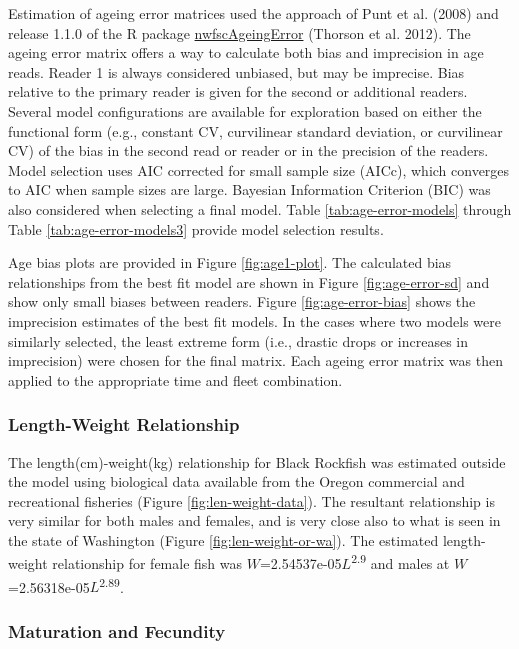 \documentclass[11pt,
  english,
  letterpaper,
]{article}
\begin{document}
Estimation of ageing error matrices used the approach of Punt et al. (2008) and release 1.1.0 of the R package \href{https://github.com/pfmc-assessment/nwfscAgeingError}{nwfscAgeingError} (Thorson et al. 2012). The ageing error matrix offers a way to calculate both bias and imprecision in age reads. Reader 1 is always considered unbiased, but may be imprecise. Bias relative to the primary reader is given for the second or additional readers. Several model configurations are available for exploration based on either the functional form (e.g., constant CV, curvilinear standard deviation, or curvilinear CV) of the bias in the second read or reader or in the precision of the readers. Model selection uses AIC corrected for small sample size (AICc), which converges to AIC when sample sizes are large. Bayesian Information Criterion (BIC) was also considered when selecting a final model. Table \ref{tab:age-error-models} through Table \ref{tab:age-error-models3} provide model selection results.

Age bias plots are provided in Figure \ref{fig:age1-plot}. The calculated bias relationships from the best fit model are shown in Figure \ref{fig:age-error-sd} and show only small biases between readers. Figure \ref{fig:age-error-bias} shows the imprecision estimates of the best fit models. In the cases where two models were similarly selected, the least extreme form (i.e., drastic drops or increases in imprecision) were chosen for the final matrix. Each ageing error matrix was then applied to the appropriate time and fleet combination.

\hypertarget{length-weight-relationship}{%
\subsubsection{Length-Weight Relationship}\label{length-weight-relationship}}

The length(cm)-weight(kg) relationship for Black Rockfish was estimated outside the model using biological data available from the Oregon commercial and recreational fisheries (Figure \ref{fig:len-weight-data}). The resultant relationship is very similar for both males and females, and is very close also to what is seen in the state of Washington (Figure \ref{fig:len-weight-or-wa}). The estimated length-weight relationship for female fish was \(W\)=2.54537e-05\(L\)\textsuperscript{2.9} and males at \(W\)=2.56318e-05\(L\)\textsuperscript{2.89}.

\hypertarget{maturation-and-fecundity}{%
\subsubsection{Maturation and Fecundity}\label{maturation-and-fecundity}}
\end{document}
